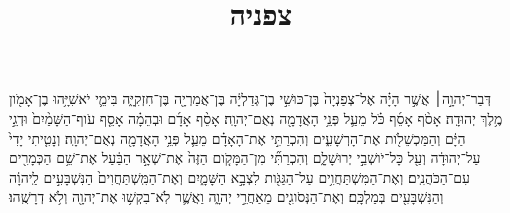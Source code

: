 \documentclass{openreader}
\title{צפניה}
\date{}
\begin{document}
\maketitle
\raggedbottom 
\fontsize{16pt}{24pt}\selectfont


דְּבַר־יְהוָ֣ה׀ אֲשֶׁ֣ר הָיָ֗ה אֶל־צְפַנְיָה֙ בֶּן־כּוּשִׁ֣י בֶן־גְּדַלְיָ֔ה בֶּן־אֲמַרְיָ֖ה בֶּן־חִזְקִיָּ֑ה בִּימֵ֛י יֹאשִׁיָּ֥הוּ בֶן־אָמֹ֖ון מֶ֥לֶךְ יְהוּדָֽה׃ 
אָסֹ֨ף אָסֵ֜ף כֹּ֗ל מֵעַ֛ל פְּנֵ֥י הָאֲדָמָ֖ה נְאֻם־יְהוָֽה׃ 
אָסֵ֨ף אָדָ֜ם וּבְהֵמָ֗ה אָסֵ֤ף עֹוף־הַשָּׁמַ֨יִם֙ וּדְגֵ֣י הַיָּ֔ם וְהַמַּכְשֵׁלֹ֖ות אֶת־הָרְשָׁעִ֑ים וְהִכְרַתִּ֣י אֶת־הָאָדָ֗ם מֵעַ֛ל פְּנֵ֥י הָאֲדָמָ֖ה נְאֻם־יְהוָֽה׃ 
וְנָטִ֤יתִי יָדִי֙ עַל־יְהוּדָ֔ה וְעַ֖ל כָּל־יֹושְׁבֵ֣י יְרוּשָׁלִָ֑ם וְהִכְרַתִּ֞י מִן־הַמָּקֹ֤ום הַזֶּה֙ אֶת־שְׁאָ֣ר הַבַּ֔עַל אֶת־שֵׁ֥ם הַכְּמָרִ֖ים עִם־הַכֹּהֲנִֽים׃ 
וְאֶת־הַמִּשְׁתַּחֲוִ֥ים עַל־הַגַּגֹּ֖ות לִצְבָ֣א הַשָּׁמָ֑יִם וְאֶת־הַמִּֽשְׁתַּחֲוִים֙ הַנִּשְׁבָּעִ֣ים לַֽיהוָ֔ה וְהַנִּשְׁבָּעִ֖ים בְּמַלְכָּֽם׃ 
וְאֶת־הַנְּסֹוגִ֖ים מֵאַחֲרֵ֣י יְהוָ֑ה וַאֲשֶׁ֛ר לֹֽא־בִקְשׁ֥וּ אֶת־יְהוָ֖ה וְלֹ֥א דְרָשֻֽׁהוּ׃ 
\end{document}
